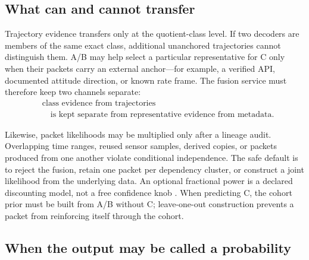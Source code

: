\documentclass[11pt]{article}
\begin{document}
    \subsection{What can and cannot transfer}

    Trajectory evidence transfers only at the quotient-class level. If two decoders are
    members of the same exact class, additional unanchored trajectories cannot distinguish
    them. A/B may help select a particular representative for C only when their packets
    carry an external anchor---for example, a verified API, documented attitude direction,
    or known rate frame. The fusion service must therefore keep two channels separate:
    \begin{equation}
        \boxed{\begin{aligned}
                   &\text{class evidence from trajectories}\\[-1mm]
                   &\quad\text{is kept separate from representative evidence from metadata.}
        \end{aligned}}
        \label{eq:cohort-two-channels}
    \end{equation}

    Likewise, packet likelihoods may be multiplied only after a lineage audit. Overlapping
    time ranges, reused sensor samples, derived copies, or packets produced from one another
    violate conditional independence. The safe default is to reject the fusion, retain one
    packet per dependency cluster, or construct a joint likelihood from the underlying data.
    An optional fractional power is a declared discounting model, not a free confidence knob
    \cite{ibrahim2000}. When predicting C, the cohort prior must be built from A/B without C;
    leave-one-out construction prevents a packet from reinforcing itself through the cohort.

    \subsection{When the output may be called a probability}
\end{document}
